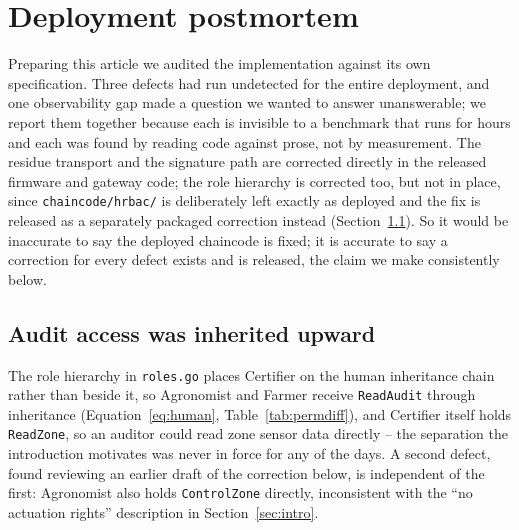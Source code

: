 \documentclass[a4paper,fleqn]{cas-sc}
\begin{document}
\FloatBarrier
\section{Deployment postmortem}
\label{sec:postmortem}

Preparing this article we audited the implementation against its own
specification. Three defects had run undetected for the entire deployment,
and one observability gap made a question we wanted to answer
unanswerable; we report them together because each is invisible to a
benchmark that runs for hours and each was found by reading code against
prose, not by measurement. The residue transport and the signature path
are corrected directly in the released firmware and gateway code; the role
hierarchy is corrected too, but not in place, since
\texttt{chaincode/hrbac/} is deliberately left exactly as deployed and the
fix is released as a separately packaged correction instead
(Section~\ref{subsec:pm_policy}). So it would be inaccurate to say the
deployed chaincode is fixed; it is accurate to say a correction for every
defect exists and is released, the claim we make consistently below.

\subsection{Audit access was inherited upward}
\label{subsec:pm_policy}

The role hierarchy in \texttt{roles.go} places Certifier on the human
inheritance chain rather than beside it, so Agronomist and Farmer receive
\texttt{ReadAudit} through inheritance (Equation~\eqref{eq:human},
Table~\ref{tab:permdiff}), and Certifier itself holds \texttt{ReadZone}, so
an auditor could read zone sensor data directly -- the separation the
introduction motivates was never in force for any of the \DeployDays{}
days. A second defect, found reviewing an earlier draft of the correction
below, is independent of the first: Agronomist also holds
\texttt{ControlZone} directly, inconsistent with the ``no actuation
rights'' description in Section~\ref{sec:intro}.
\end{document}
